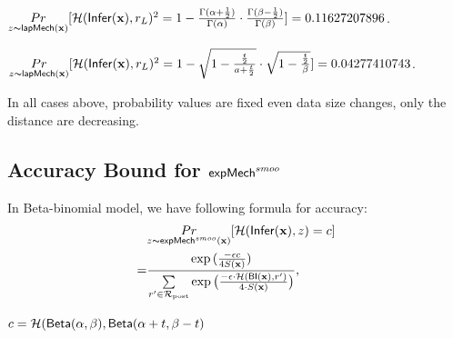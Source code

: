 \documentclass{article}
\begin{document}
  $\underset{z \thicksim \mathsf{lapMech}(\textbf{x})}{Pr}[\mathcal{H}(\mathsf{Infer}(\textbf{x}), r_L )^2 = 1 - \frac{\Gamma(\alpha+\frac{1}{2})}{\Gamma(\alpha)} \cdot
  \frac{\Gamma(\beta - \frac{1}{2})}{\Gamma(\beta)} ] = 0.11627207896$. 

  $\underset{z \thicksim \mathsf{lapMech}(\textbf{x})}{Pr}[\mathcal{H}(\mathsf{Infer}(\textbf{x}), r_L )^2 = 1 - 
  \sqrt{1 - \frac{\frac{t}{2}}{a + \frac{t}{2}}}
  \cdot
  \sqrt{1 - \frac{\frac{t}{2}}{\beta}}] = 0.04277410743$.

In all cases above, probability values are fixed even data size changes, only the distance are decreasing.

\subsection{Accuracy Bound for $\mathsf{expMech}^{smoo}$}
\label{subsec_accuracy_smoo}
  In Beta-binomial model,
  we have following formula for accuracy:
  \begin{align*}
  \label{eq_acc}
  & \underset{z \thicksim \mathsf{expMech}^{smoo}(\textbf{x})}{Pr}[\mathcal{H}(\mathsf{Infer}(\textbf{x}), z) = c  ]\\ 
  = & \frac{\exp{(\frac{- \epsilon c}{4 S(\textbf{x})})}}{\sum\limits_{r'\in \mathcal{R}_{\textup{post}}} \exp \big(\frac{-\epsilon\cdot \mathcal{H} (\mathsf{BI}(\textbf{x}),r')}{4 \cdot S(\textbf{x})}\big)},
  \end{align*}

  $c = \mathcal{H}(\mathsf{Beta}(\alpha, \beta), \mathsf{Beta}(\alpha + t, \beta - t)$
\end{document}
